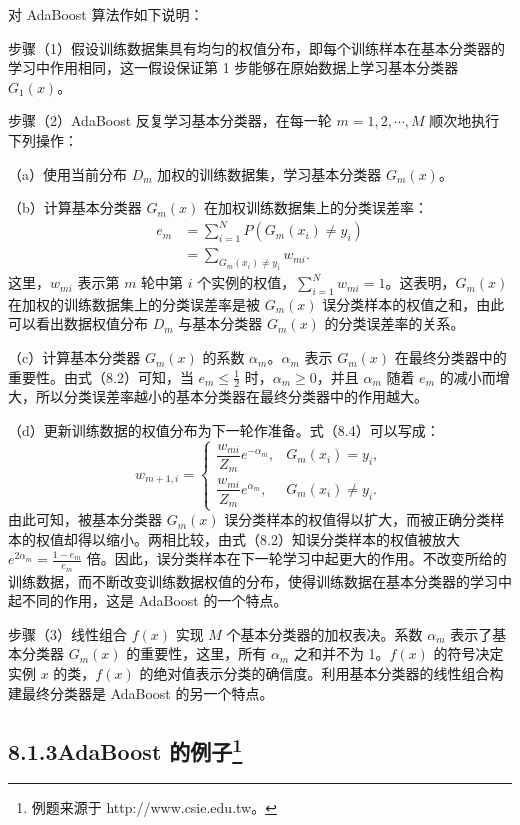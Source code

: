 \documentclass[UTF8,12pt,a4paper,fontset=fandol]{ctexart}
\begin{document}
对 AdaBoost 算法作如下说明：

步骤（1）\quad 假设训练数据集具有均匀的权值分布，即每个训练样本在基本分类器的学习中作用相同，这一假设保证第 1 步能够在原始数据上学习基本分类器 $G_1(x)$。

步骤（2）\quad AdaBoost 反复学习基本分类器，在每一轮 $m=1,2,\cdots,M$ 顺次地执行下列操作：

（a）使用当前分布 $D_m$ 加权的训练数据集，学习基本分类器 $G_m(x)$。

（b）计算基本分类器 $G_m(x)$ 在加权训练数据集上的分类误差率：
\begin{equation}
\begin{aligned}
e_m&=\sum_{i=1}^N P(G_m(x_i)\ne y_i)\\
&=\sum_{G_m(x_i)\ne y_i}w_{mi}.
\end{aligned}
\tag{8.8}
\end{equation}
这里，$w_{mi}$ 表示第 $m$ 轮中第 $i$ 个实例的权值，$\sum_{i=1}^Nw_{mi}=1$。这表明，$G_m(x)$ 在加权的训练数据集上的分类误差率是被 $G_m(x)$ 误分类样本的权值之和，由此可以看出数据权值分布 $D_m$ 与基本分类器 $G_m(x)$ 的分类误差率的关系。

（c）计算基本分类器 $G_m(x)$ 的系数 $\alpha_m$。$\alpha_m$ 表示 $G_m(x)$ 在最终分类器中的重要性。由式（8.2）可知，当 $e_m\leq \frac{1}{2}$ 时，$\alpha_m\geq 0$，并且 $\alpha_m$ 随着 $e_m$ 的减小而增大，所以分类误差率越小的基本分类器在最终分类器中的作用越大。

（d）更新训练数据的权值分布为下一轮作准备。式（8.4）可以写成：
\[
w_{m+1,i}=
\begin{cases}
\dfrac{w_{mi}}{Z_m}e^{-\alpha_m}, & G_m(x_i)=y_i,\\[0.4em]
\dfrac{w_{mi}}{Z_m}e^{\alpha_m}, & G_m(x_i)\ne y_i.
\end{cases}
\]
由此可知，被基本分类器 $G_m(x)$ 误分类样本的权值得以扩大，而被正确分类样本的权值却得以缩小。两相比较，由式（8.2）知误分类样本的权值被放大 $e^{2\alpha_m}=\frac{1-e_m}{e_m}$ 倍。因此，误分类样本在下一轮学习中起更大的作用。不改变所给的训练数据，而不断改变训练数据权值的分布，使得训练数据在基本分类器的学习中起不同的作用，这是 AdaBoost 的一个特点。

步骤（3）\quad 线性组合 $f(x)$ 实现 $M$ 个基本分类器的加权表决。系数 $\alpha_m$ 表示了基本分类器 $G_m(x)$ 的重要性，这里，所有 $\alpha_m$ 之和并不为 1。$f(x)$ 的符号决定实例 $x$ 的类，$f(x)$ 的绝对值表示分类的确信度。利用基本分类器的线性组合构建最终分类器是 AdaBoost 的另一个特点。

\subsection*{8.1.3\quad AdaBoost 的例子\protect\footnote{例题来源于 http://www.csie.edu.tw。}}
\end{document}
